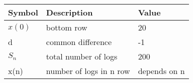 \begin{tabular}{ | m{1.0cm} | m{3cm} |m{1cm} |} 
  \hline
 Symbol &Description& Value \\ 
 \hline
$x(0)$&bottom row& 20  \\
\hline
d&common difference & -1  \\
\hline
$S_n$& total number of logs&200 \\
\hline
x(n)&number of logs in n row&  depends on n\\
\hline
\end{tabular}\\
\caption{}
\label{Table:1}